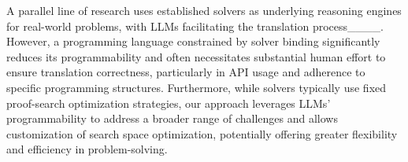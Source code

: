A parallel line of research uses established solvers as underlying reasoning engines for real-world problems, with LLMs facilitating the translation process____. However, a programming language constrained by solver binding significantly reduces its programmability and often necessitates substantial human effort to ensure translation correctness, particularly in API usage and adherence to specific programming structures. Furthermore, while solvers typically use fixed proof-search optimization strategies, our approach leverages LLMs' programmability to address a broader range of challenges and allows customization of search space optimization, potentially offering greater flexibility and efficiency in problem-solving. %
